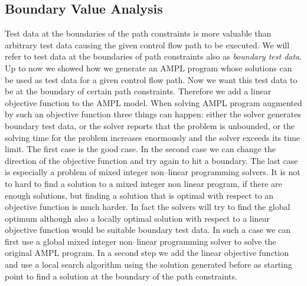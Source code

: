 \documentclass[runningheads,a4paper]{llncs}%
\begin{document}
\subsection{Boundary Value Analysis}%
\label{sec:BoundaryValueAnalysis}%
Test data at the boundaries of the path constraints is more valuable than arbitrary test data causing the given control flow path to be executed. We will refer to test data at the boundaries of path constraints also as \emph{boundary test data}. Up to now we showed how we generate an AMPL program whose solutions can be used as test data for a given control flow path. Now we want this test data to be at the boundary of certain path constraints. Therefore we add a linear objective function to the AMPL model. When solving AMPL program augmented by such an objective function three things can happen: either the solver generates boundary test data, or the solver reports that the problem is unbounded, or the solving time for the problem increases enormously and the solver exceeds its time limit. The first case is the good case. In the second case we can change the direction of the objective function and try again to hit a boundary. The last case is especially a problem of mixed integer non--linear programming solvers. It is not to hard to find a solution to a mixed integer non linear program, if there are enough solutions, but finding a solution that is optimal with respect to an objective function is much harder. In fact the solvers will try to find the global optimum although also a locally optimal solution with respect to a linear objective function would be suitable boundary test data. In such a case we can first use a global mixed integer non--linear programming solver to solve the original AMPL program. In a second step we add the linear objective function and use a local search algorithm using the solution generated before as starting point to find a solution at the boundary of the path constraints.
\end{document}
